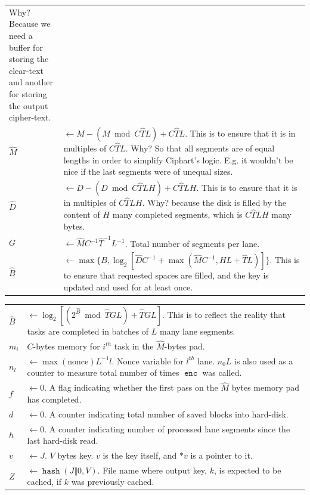 \documentclass[twocolumn]{article}
\DeclareMathOperator{\enc}{\mathtt{enc}}
\DeclareMathOperator{\maxf}{max}
\DeclareMathOperator{\hash}{\mathtt{hash}}
\begin{document}
\begin{tabularx}{\columnwidth}{lX}
                    Why?  Because we need a buffer for storing the
                    clear-text and another for storing the output
                    cipher-text.\\
    $\hat M$    & $\gets M - (M \bmod C\hat TL) + C\hat TL$.  This is to
                    ensure that it is in multiples of $C\hat TL$.  Why?  So
                    that all segments are of equal lengths in order to
                    simplify Ciphart's logic.  E.g. it wouldn't be
                    nice if the last segments were of unequal sizes.\\
    $\hat D$    & $\gets D - (D \bmod C\hat TLH) + C\hat TLH$.  This is to
                    ensure that it is in multiples of $C\hat TLH$.  Why?
                    because the disk is filled by the content of $H$ many
                    completed segments, which is $C\hat TLH$ many bytes.\\
    $G$         & $\gets \hat MC^{-1}\hat T^{-1}L^{-1}$.  Total number of
                    segments per lane.\\
    $\hat B$    & $\gets \max\{
                        B,
                        \log_2[\hat DC^{-1} + \max(\hat MC^{-1}, HL + \hat
                        TL)]
                    \}$.  This is to ensure that requested spaces are
                    filled, and the key is updated and used for at least
                    once.\\
\end{tabularx}
\begin{tabularx}{\columnwidth}{lX}
    $\hat B$    & $\gets \log_2[(2^{\hat B} \bmod \hat TGL) + \hat TGL]$.
                    This is to reflect the reality that tasks are completed
                    in batches of $L$ many lane segments.\\
    $m_i$       & $C$-bytes memory for $i^{th}$ task in the $\hat M$-bytes
                    pad.\\
    $n_l$       & $\gets \maxf(\text{nonce})L^{-1}l$.  Nonce variable for
                    $l^{th}$ lane.  $n_0L$ is also used as a counter to
                    measure total number of times $\enc$ was called.\\
    $f$         & $\gets 0$.  A flag indicating whether the first pass on
                    the $\hat M$ bytes memory pad has completed.\\
    $d$         & $\gets 0$.  A counter indicating total number of saved
                    blocks into hard-disk.\\
    $h$         & $\gets 0$.  A counter indicating number of processed lane
                    segments since the last hard-disk read.\\
    $v$         & $\gets J$.  $V$ bytes key.  $v$ is the key
                    itself, and $*v$ is a pointer to it.\\
    $Z$         & $\gets \hash(J \Vert 0, V)$.  File name where output key,
                    $k$, is expected to be cached, if $k$ was previously
                    cached.\\
\end{tabularx}
\end{document}
